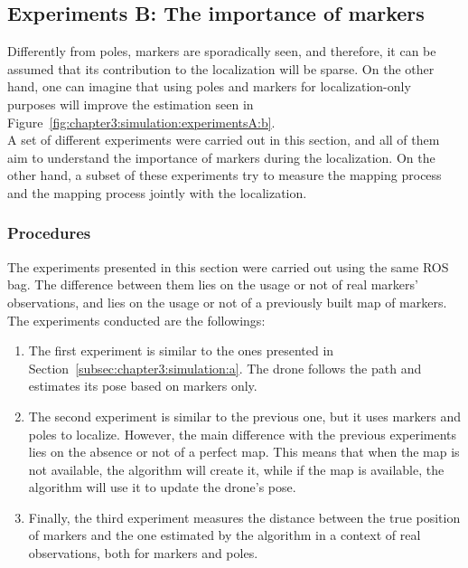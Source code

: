 \subsection{Experiments B: The importance of markers}
\label{subsec:chapter3:simulation:b}
Differently from poles, markers are sporadically seen, and therefore, it can be assumed that its contribution to the localization will be sparse. On the other hand, one can imagine that using poles and markers for localization-only purposes will improve the estimation seen in Figure~\ref{fig:chapter3:simulation:experimentsA:b}.\\

A set of different experiments were carried out in this section, and all of them aim to understand the importance of markers during the localization. On the other hand, a subset of these experiments try to measure the mapping process and the mapping process jointly with the localization.

\subsubsection{Procedures}
\label{subsubsec:chapter3:simulation:b:procedures}
The experiments presented in this section were carried out using the same \ac{ROS} bag. The difference between them lies on the usage or not of real markers' observations, and lies on the usage or not of a previously built map of markers.\\

The experiments conducted are the followings:
\begin{enumerate}
    \item{The first experiment is similar to the ones presented in Section~\ref{subsec:chapter3:simulation:a}. The drone follows the path and estimates its pose based on markers only.}
    \item{The second experiment is similar to the previous one, but it uses markers and poles to localize. However, the main difference with the previous experiments lies on the absence or not of a perfect map. This means that when the map is not available, the algorithm will create it, while if the map is available, the algorithm will use it to update the drone's pose.}
    \item{Finally, the third experiment measures the distance between the true position of markers and the one estimated by the algorithm in a context of real observations, both for markers and poles.}
\end{enumerate}

